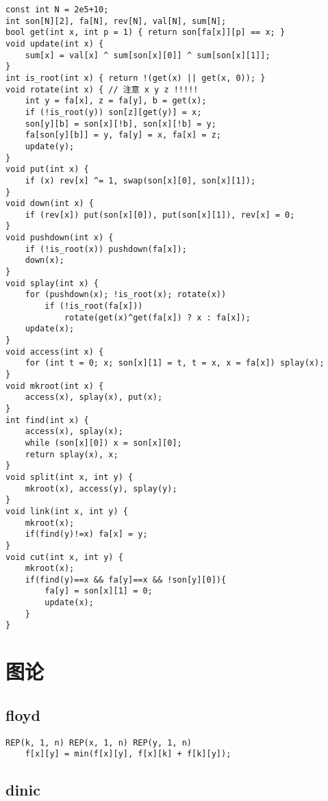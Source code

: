 \documentclass[a4paper,landscape,twocolumn]{ctexart}
\begin{document}
\begin{lstlisting}
const int N = 2e5+10;
int son[N][2], fa[N], rev[N], val[N], sum[N];
bool get(int x, int p = 1) { return son[fa[x]][p] == x; }
void update(int x) {
	sum[x] = val[x] ^ sum[son[x][0]] ^ sum[son[x][1]];
}
int is_root(int x) { return !(get(x) || get(x, 0)); }
void rotate(int x) { // 注意 x y z !!!!!
	int y = fa[x], z = fa[y], b = get(x);
	if (!is_root(y)) son[z][get(y)] = x;
	son[y][b] = son[x][!b], son[x][!b] = y;
	fa[son[y][b]] = y, fa[y] = x, fa[x] = z;
	update(y);
}
void put(int x) {
	if (x) rev[x] ^= 1, swap(son[x][0], son[x][1]);
}
void down(int x) {
	if (rev[x]) put(son[x][0]), put(son[x][1]), rev[x] = 0;
}
void pushdown(int x) {
	if (!is_root(x)) pushdown(fa[x]);
	down(x);
}
void splay(int x) {
	for (pushdown(x); !is_root(x); rotate(x))
		if (!is_root(fa[x]))
			rotate(get(x)^get(fa[x]) ? x : fa[x]);
	update(x);
}
void access(int x) {
	for (int t = 0; x; son[x][1] = t, t = x, x = fa[x]) splay(x);
}
void mkroot(int x) {
	access(x), splay(x), put(x);
}
int find(int x) {
	access(x), splay(x);
	while (son[x][0]) x = son[x][0];
	return splay(x), x;
}
void split(int x, int y) {
	mkroot(x), access(y), splay(y);
}
void link(int x, int y) {
	mkroot(x);
	if(find(y)!=x) fa[x] = y;
}
void cut(int x, int y) {
	mkroot(x);
	if(find(y)==x && fa[y]==x && !son[y][0]){
		fa[y] = son[x][1] = 0;
		update(x);
	}
}
\end{lstlisting}

\section{图论}

\subsection{floyd}

\begin{lstlisting}
REP(k, 1, n) REP(x, 1, n) REP(y, 1, n)
	f[x][y] = min(f[x][y], f[x][k] + f[k][y]);
\end{lstlisting}

\subsection{dinic}
\end{document}
